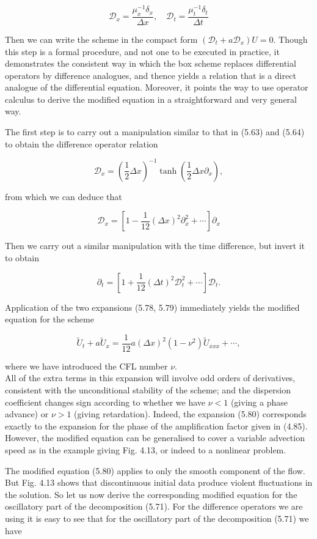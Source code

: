 \documentclass[10pt]{article}
\begin{document}
\[
\mathcal{D}_{x}=\frac{\mu_{x}^{-1} \delta_{x}}{\Delta x}, \quad \mathcal{D}_{t}=\frac{\mu_{t}^{-1} \delta_{t}}{\Delta t}
\]

Then we can write the scheme in the compact form \(\left(\mathcal{D}_{t}+a \mathcal{D}_{x}\right) U=0\). Though this step is a formal procedure, and not one to be executed in practice, it demonstrates the consistent way in which the box scheme replaces differential operators by difference analogues, and thence yields a relation that is a direct analogue of the differential equation. Moreover, it points the way to use operator calculus to derive the modified equation in a straightforward and very general way.

The first step is to carry out a manipulation similar to that in (5.63) and (5.64) to obtain the difference operator relation

\[
\mathcal{D}_{x}=\left(\frac{1}{2} \Delta x\right)^{-1} \tanh \left(\frac{1}{2} \Delta x \partial_{x}\right),
\]

from which we can deduce that

\[
\mathcal{D}_{x}=\left[1-\frac{1}{12}(\Delta x)^{2} \partial_{x}^{2}+\cdots\right] \partial_{x}
\]

Then we carry out a similar manipulation with the time difference, but invert it to obtain

\[
\partial_{t}=\left[1+\frac{1}{12}(\Delta t)^{2} \mathcal{D}_{t}^{2}+\cdots\right] \mathcal{D}_{t} .
\]

Application of the two expansions (5.78, 5.79) immediately yields the modified equation for the scheme

\[
\tilde{U}_{t}+a \tilde{U}_{x}=\frac{1}{12} a(\Delta x)^{2}\left(1-\nu^{2}\right) \tilde{U}_{x x x}+\cdots,
\]

where we have introduced the CFL number \(\nu\).\\
All of the extra terms in this expansion will involve odd orders of derivatives, consistent with the unconditional stability of the scheme; and the dispersion coefficient changes sign according to whether we have \(\nu<1\) (giving a phase advance) or \(\nu>1\) (giving retardation). Indeed, the expansion (5.80) corresponds exactly to the expansion for the phase of the amplification factor given in (4.85). However, the modified equation can be generalised to cover a variable advection speed as in the example giving Fig. 4.13, or indeed to a nonlinear problem.

The modified equation (5.80) applies to only the smooth component of the flow. But Fig. 4.13 shows that discontinuous initial data produce violent fluctuations in the solution. So let us now derive the corresponding modified equation for the oscillatory part of the decomposition (5.71). For the difference operators we are using it is easy to see that for the oscillatory part of the decomposition (5.71) we have
\end{document}
